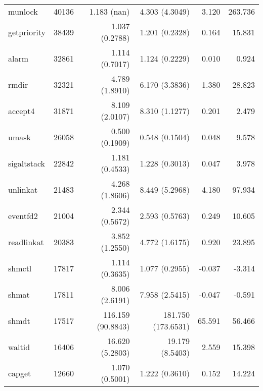 \begin{longtable}{>{\ttfamily}lrrrrr}
                        munlock &       40136 &              1.183 (nan) &           4.303 (4.3049) &           3.120 &      263.736 \\
                    getpriority &       38439 &           1.037 (0.2788) &           1.201 (0.2328) &           0.164 &       15.831 \\
                          alarm &       32861 &           1.114 (0.7017) &           1.124 (0.2229) &           0.010 &        0.924 \\
                          rmdir &       32321 &           4.789 (1.8910) &           6.170 (3.3836) &           1.380 &       28.823 \\
                        accept4 &       31871 &           8.109 (2.0107) &           8.310 (1.1277) &           0.201 &        2.479 \\
                          umask &       26058 &           0.500 (0.1909) &           0.548 (0.1504) &           0.048 &        9.578 \\
                    sigaltstack &       22842 &           1.181 (0.4533) &           1.228 (0.3013) &           0.047 &        3.978 \\
                       unlinkat &       21483 &           4.268 (1.8606) &           8.449 (5.2968) &           4.180 &       97.934 \\
                       eventfd2 &       21004 &           2.344 (0.5672) &           2.593 (0.5763) &           0.249 &       10.605 \\
                     readlinkat &       20383 &           3.852 (1.2550) &           4.772 (1.6175) &           0.920 &       23.895 \\
                         shmctl &       17817 &           1.114 (0.3635) &           1.077 (0.2955) &          -0.037 &       -3.314 \\
                          shmat &       17811 &           8.006 (2.6191) &           7.958 (2.5415) &          -0.047 &       -0.591 \\
                          shmdt &       17517 &        116.159 (90.8843) &       181.750 (173.6531) &          65.591 &       56.466 \\
                         waitid &       16406 &          16.620 (5.2803) &          19.179 (8.5403) &           2.559 &       15.398 \\
                         capget &       12660 &           1.070 (0.5001) &           1.222 (0.3610) &           0.152 &       14.224 \\

\end{longtable}
